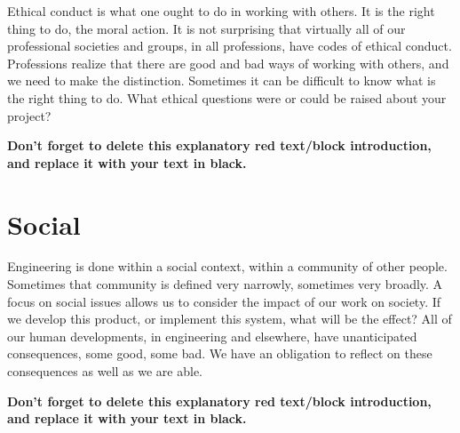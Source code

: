 \begin{tcolorbox}[      %
    boxrule=0pt,        %
    colback=white,      %
    coltext=red         %
]                       %
    Ethical conduct is what one ought to do in working with others. It is the right thing to do, the moral action. It is not surprising that virtually all of our professional societies and groups, in all professions, have codes of ethical conduct. Professions realize that there are good and bad ways of working with others, and we need to make the distinction. Sometimes it can be difficult to know what is the right thing to do. What ethical questions were or could be raised about your project?
    
    \vspace{15pt}       %
    \begin{center}      %
    \textbf{Don't forget to delete this explanatory red text/block introduction, and replace it with your text in black.}
    \end{center}        %
\end{tcolorbox}         %

\section{Social} %

\begin{tcolorbox}[      %
    boxrule=0pt,        %
    colback=white,      %
    coltext=red         %
]                       %
    Engineering is done within a social context, within a community of other people. Sometimes that community is defined very narrowly, sometimes very broadly. A focus on social issues allows us to consider the impact of our work on society. If we develop this product, or implement this system, what will be the effect? All of our human developments, in engineering and elsewhere, have unanticipated consequences, some good, some bad. We have an obligation to reflect on these consequences as well as we are able.
    
    \vspace{15pt}       %
    \begin{center}      %
    \textbf{Don't forget to delete this explanatory red text/block introduction, and replace it with your text in black.}
    \end{center}        %
\end{tcolorbox}         %


